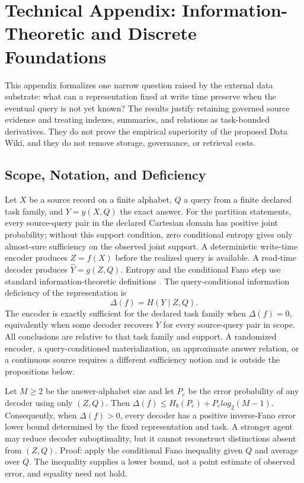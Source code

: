 \section{Technical Appendix: Information-Theoretic and Discrete Foundations}
\label{sec:formal-data-foundations}

This appendix formalizes one narrow question raised by the external data substrate: what can a representation fixed at write time preserve when the eventual query is not yet known? The results justify retaining governed source evidence and treating indexes, summaries, and relations as task-bounded derivatives. They do not prove the empirical superiority of the proposed Data Wiki, and they do not remove storage, governance, or retrieval costs.

\subsection{Scope, Notation, and Deficiency}

Let $X$ be a source record on a finite alphabet, $Q$ a query from a finite declared task family, and $Y=y(X,Q)$ the exact answer. For the partition statements, every source-query pair in the declared Cartesian domain has positive joint probability; without this support condition, zero conditional entropy gives only almost-sure sufficiency on the observed joint support. A deterministic write-time encoder produces $Z=f(X)$ before the realized query is available. A read-time decoder produces $\widehat{Y}=g(Z,Q)$. Entropy and the conditional Fano step use standard information-theoretic definitions \cite{cover2006elements}. The query-conditional information deficiency of the representation is
\begin{equation}
\Delta(f)=H(Y\mid Z,Q).
\end{equation}
The encoder is exactly sufficient for the declared task family when $\Delta(f)=0$, equivalently when some decoder recovers $Y$ for every source-query pair in scope. All conclusions are relative to that task family and support. A randomized encoder, a query-conditioned materialization, an approximate answer relation, or a continuous source requires a different sufficiency notion and is outside the propositions below.

\begin{proposition}
Let $M\geq2$ be the answer-alphabet size and let $P_e$ be the error probability of any decoder using only $(Z,Q)$. Then $\Delta(f)\leq H_b(P_e)+P_e log_2(M-1)$. Consequently, when $\Delta(f)>0$, every decoder has a positive inverse-Fano error lower bound determined by the fixed representation and task. A stronger agent may reduce decoder suboptimality, but it cannot reconstruct distinctions absent from $(Z,Q)$. Proof: apply the conditional Fano inequality given $Q$ and average over $Q$. The inequality supplies a lower bound, not a point estimate of observed error, and equality need not hold.
\end{proposition}

